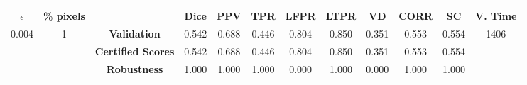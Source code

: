 \begin{longtable}{ c  c | c | c  c  c  c  c  c  c c c}
\toprule \textbf{$\epsilon$} & \textbf{\% pixels} & & \textbf{Dice} & \textbf{PPV} & \textbf{TPR} & \textbf{LFPR} & \textbf{LTPR} & \textbf{VD} & \textbf{CORR} & \textbf{SC} & \textbf{V. Time} \\
\midrule 
\multirow{3}{*}{0.004}  & \multirow{3}{*}{1} &\textbf{Validation} & 0.542 & 0.688 & 0.446 & 0.804 & 0.850 & 0.351 & 0.553 & 0.554 & \multirow{3}{*}{1406} \\
 & & \textbf{Certified Scores} & 0.542 & 0.688 & 0.446 & 0.804 & 0.850 & 0.351 & 0.553 & 0.554 & \\
& & \textbf{Robustness} & 1.000 & 1.000 & 1.000 & 0.000 & 1.000 & 0.000 & 1.000 & 1.000 & \\
\end{longtable}